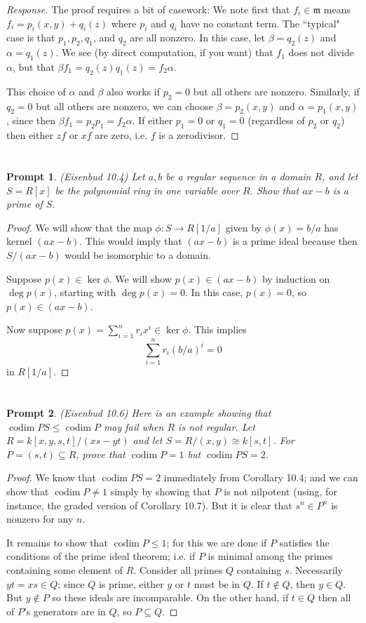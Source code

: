 \documentclass[Letter,12pt]{article}
\newcommand{\mfr}{\mathfrak{m}}
\renewcommand{\a}{\alpha}
\renewcommand{\b}{\beta}
\newcommand{\<}{\left\langle}
\renewcommand{\>}{\right\rangle}
\newcommand{\is}{\cong}
\DeclareMathOperator{\codim}{codim}
\renewcommand{\ss}{\subseteq}
\newcommand{\prob}[1]{\setcounter{section}{#1-1}\section{}}
\newtheorem*{prompt*}{Prompt}
\theoremstyle{definition}
\begin{document}
\begin{proof}[Response]
		The proof requires a bit of casework: We note first that $f_i\in\mfr$ means $f_i=p_i(x,y)+q_i(z)$ where $p_i$ and $q_i$ have no constant term. The ``typical" case is that $p_1,p_2,q_1$, and $q_2$ are all nonzero. In this case, let $\b=q_2(z)$ and $\a=q_1(z)$. We see (by direct computation, if you want) that $f_1$ does not divide $\a$, but that $\b f_1 = q_2(z)q_1(z) = f_2\a$.
		
		This choice of $\a$ and $\b$ also works if $p_2=0$ but all others are nonzero. Similarly, if $q_2=0$ but all others are nonzero, we can choose $\b=p_2(x,y)$ and $\a=p_1(x,y)$, since then $\b f_1 = p_2p_1 = f_2 \a$. If either $p_1=0$ or $q_1=0$ (regardless of $p_2$ or $q_2$) then either $zf$ or $xf$ are zero, i.e. $f$ is a zerodivisor.
	\end{proof}
	
	
	\prob{12}
	\begin{prompt*}
		(Eisenbud 10.4) Let $a,b$ be a regular sequence in a domain $R$, and let $S=R[x]$ be the polynomial ring in one variable over $R$.  Show that $ax-b$ is a prime of $S$.
	\end{prompt*}
	\begin{proof}
		We will show that the map $\phi:S\to R[1/a]$ given by $\phi(x)=b/a$ has kernel $(ax-b)$.  This would imply that $(ax-b)$ is a prime ideal because then $S/(ax-b)$ would be isomorphic to a domain.
		
		Suppose $p(x)\in\ker \phi$.  We will show $p(x)\in (ax-b)$ by induction on $\deg p(x)$, starting with $\deg p(x)=0$.  In this case, $p(x)=0$, so $p(x)\in (ax-b)$.
		
		Now suppose $p(x)=\sum_{i=1}^nr_ix^i\in\ker \phi$.  This implies
		\[\sum_{i=1}^nr_i(b/a)^i=0\]
		in $R[1/a]$.
	\end{proof}
	
	
	\prob{13}
	\begin{prompt*}
		(Eisenbud 10.6) Here is an example showing that $\codim PS\leq \codim P$ may fail when $R$ is not regular. Let $R=k[x,y,s,t]/(xs-yt)$ and let $S=R/(x,y) \is k[s,t]$. For $P=(s,t)\ss R$, prove that $\codim P = 1$ but $\codim PS=2$.
	\end{prompt*}
	\begin{proof}
		We know that $\codim PS=2$ immediately from Corollary 10.4; and we can show that $\codim P \neq 1$ simply by showing that $P$ is not nilpotent (using, for instance, the graded version of Corollary 10.7). But it is clear that $s^n\in P^n$ is nonzero for any $n$.
		
		It remains to show that $\codim P \leq 1$; for this we are done if $P$ satisfies the conditions of the prime ideal theorem; i.e. if $P$ is minimal among the primes containing some element of $R$. Consider all primes $Q$ containing $s$. Necessarily $yt=xs\in Q$; since $Q$ is prime, either $y$ or $t$ must be in $Q$. If $t\notin Q$, then $y\in Q$. But $y\notin P$ so these ideals are incomparable. On the other hand, if $t\in Q$ then all of $P$'s generators are in $Q$, so $P\ss Q$.
	\end{proof}
	
\end{document}
